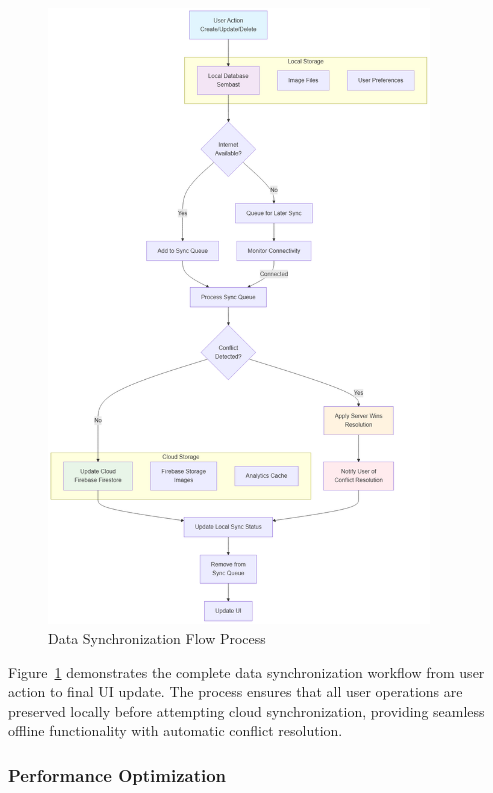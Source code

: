 \begin{figure}[H]
\centering
\includegraphics[width=0.9\textwidth]{files/imgs/mermaid_diagram.png}
\caption{Data Synchronization Flow Process}
\label{fig:data-sync-flow}
\end{figure}

Figure~\ref{fig:data-sync-flow} demonstrates the complete data synchronization workflow from user action to final UI update. The process ensures that all user operations are preserved locally before attempting cloud synchronization, providing seamless offline functionality with automatic conflict resolution.

\subsubsection{Performance Optimization}

